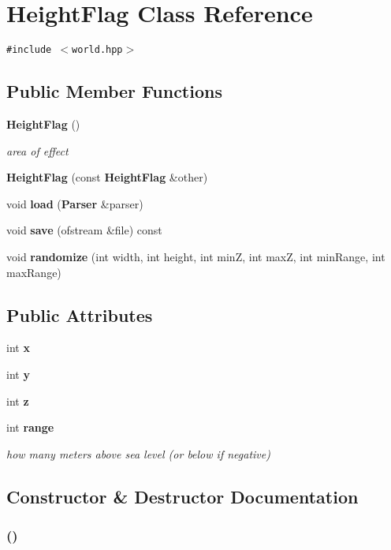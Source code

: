 \section{Height\-Flag Class Reference}
\label{classHeightFlag}
{\tt \#include $<$world.hpp$>$}

\subsection*{Public Member Functions}
\begin{CompactItemize}
\item 
{\bf Height\-Flag} ()
\begin{CompactList}\small\item\em area of effect \item\end{CompactList}\item 
{\bf Height\-Flag} (const {\bf Height\-Flag} \&other)
\item 
void {\bf load} ({\bf Parser} \&parser)
\item 
void {\bf save} (ofstream \&file) const 
\item 
void {\bf randomize} (int width, int height, int min\-Z, int max\-Z, int min\-Range, int max\-Range)
\end{CompactItemize}
\subsection*{Public Attributes}
\begin{CompactItemize}
\item 
int {\bf x}
\item 
int {\bf y}
\item 
int {\bf z}
\item 
int {\bf range}
\begin{CompactList}\small\item\em how many meters above sea level (or below if negative) \item\end{CompactList}\end{CompactItemize}


\subsection{Constructor \& Destructor Documentation}
\subsubsection{ ()}\label{classHeightFlag_a0}


